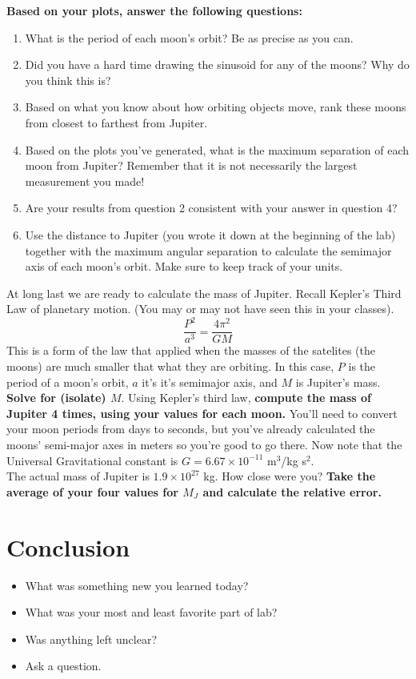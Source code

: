 \documentclass[12pt]{article}%
\begin{document}
\noindent \textbf{Based on your plots, answer the following questions:}
\begin{enumerate}
    \item What is the period of each moon's orbit? Be as precise as you can. 
    \item Did you have a hard time drawing the sinusoid for any of the moons?  Why do you think this is?
    \item Based on what you know about how orbiting objects move, rank these moons from closest to farthest from Jupiter.
    \item Based on the plots you've generated, what is the maximum separation of each moon from Jupiter? Remember that it is not necessarily the largest measurement you made!  
    \item Are your results from question 2 consistent with your answer in question 4?
    \item Use the distance to Jupiter (you wrote it down at the beginning of the lab) together with the maximum angular separation to calculate the semimajor axis of each moon's orbit.  Make sure to keep track of your units.
\end{enumerate}

At long last we are ready to calculate the mass of Jupiter. Recall Kepler's Third Law of planetary motion.  (You may or may not have seen this in your classes).
\begin{equation}
    \frac{P^2}{a^3} = \frac{4 \pi^2}{GM}
\end{equation}
This is a form of the law that applied when the masses of the satelites (the moons) are much smaller that what they are orbiting.  In this case, $P$ is the period of a moon's orbit, $a$ it's it's semimajor axis, and $M$ is Jupiter's mass.  \textbf{Solve for (isolate) $M$}.  Using Kepler's third law, \textbf{compute the mass of Jupiter 4 times, using your values for each moon.} You'll need to convert your moon periods from days to seconds, but you've already calculated the moons' semi-major axes in meters so you're good to go there. Now note that the Universal Gravitational constant is $G = 6.67 \times 10^{-11}$ m$^3$/kg s$^{2}$. \\

The actual mass of Jupiter is $1.9 \times 10^{27}$ kg. How close were you? \textbf{Take the average of your four values for $M_J$ and calculate the relative error.}

\section*{Conclusion}
\begin{itemize}
    \item What was something new you learned today?
    \item What was your most and least favorite part of lab?
    \item Was anything left unclear?
    \item Ask a question.
\end{itemize}
\end{document}
